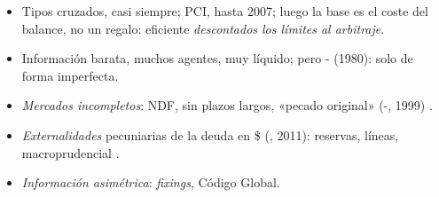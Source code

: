 \documentclass{article}
\begin{document}
\begin{columnas}
\begin{itemize}
\item Tipos cruzados, casi siempre; PCI, hasta 2007; luego la base es el coste del balance, no un regalo: eficiente \emph{descontados los límites al arbitraje}.
\end{itemize}
\begin{itemize}
\item Información barata, muchos agentes, muy líquido; pero - (1980): solo de forma imperfecta.
\end{itemize}
\begin{itemize}
\item \emph{Mercados incompletos}: NDF, sin plazos largos, «pecado original» (-, 1999) .
\item \emph{Externalidades} pecuniarias de la deuda en \$ (, 2011): reservas, líneas, macroprudencial .
\item \emph{Información asimétrica}: \emph{fixings}, Código Global.
\end{itemize}


\end{columnas}
\end{document}
